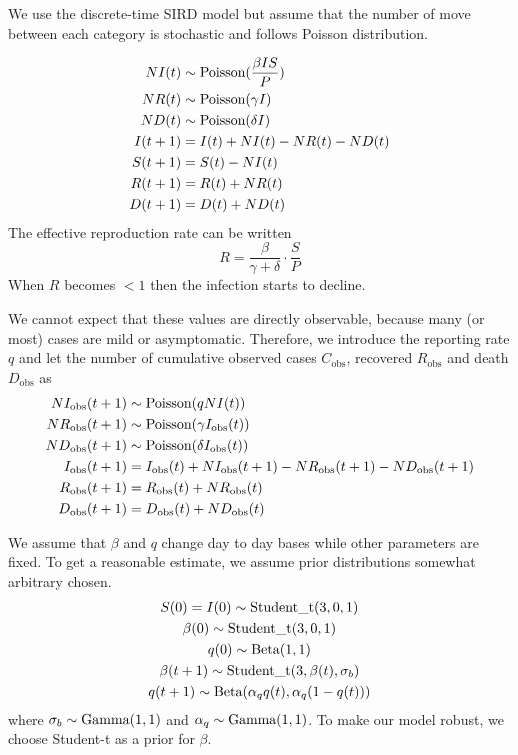 \documentclass{amsart}
\begin{document}
We use the discrete-time SIRD model but assume that the number of move between each category is stochastic and follows Poisson distribution.

\begin{align}
 NI(t) &\sim \textup{Poisson}(\frac{\beta I S}{P})\\
 NR(t) &\sim \textup{Poisson}(\gamma I)\\
 ND(t) &\sim \textup{Poisson}(\delta I)\\
 I(t+1) &= I(t) + NI(t) - NR(t) - ND(t)\\
 S(t+1) &= S(t) - NI(t)\\
 R(t+1) &= R(t) + NR(t)\\
 D(t+1) &= D(t) + ND(t)
\end{align}
The effective reproduction rate can be written
\begin{equation}
    R = \frac{\beta}{\gamma + \delta} \cdot \frac{S}{P}
\end{equation}
When $R$ becomes $<1$ then the infection starts to decline.

We cannot expect that these values are directly observable, because many (or most) cases are mild or asymptomatic.
Therefore, we introduce the reporting rate $q$ and let the number of cumulative observed cases $C_{\text{obs}}$, recovered $R_{\text{obs}}$ and death $D_{\text{obs}}$ as
\begin{align}
 NI_{\text{obs}}(t+1) &\sim \textup{Poisson}(q NI(t))\\
 NR_{\text{obs}}(t+1) &\sim \textup{Poisson}(\gamma I_{\text{obs}}(t))\\
 ND_{\text{obs}}(t+1) &\sim \textup{Poisson}(\delta I_{\text{obs}}(t))\\
 I_{\text{obs}}(t+1) &= I_{\text{obs}}(t) + NI_{\text{obs}}(t+1) - NR_{\text{obs}}(t+1) - ND_{\text{obs}}(t+1)\\
 R_{\text{obs}}(t+1) &= R_{\text{obs}}(t) + NR_{\text{obs}}(t)\\
 D_{\text{obs}}(t+1) &= D_{\text{obs}}(t) + ND_{\text{obs}}(t)
\end{align}

We assume that $\beta$ and $q$ change day to day bases while other parameters are fixed.
To get a reasonable estimate, we assume prior distributions somewhat arbitrary chosen.
\begin{gather}
 S(0) = I(0) \sim \textup{Student\_t}(3, 0, 1)\\
 \beta(0) \sim \textup{Student\_t}(3, 0, 1)\\
 q(0) \sim \textup{Beta}(1, 1)\\
 \beta(t+1) \sim \textup{Student\_t}(3, \beta(t), \sigma_b)\\
 q(t+1) \sim \textup{Beta}(\alpha_q q(t), \alpha_q(1 - q(t)))
\end{gather}
where $\sigma_b \sim \textup{Gamma}(1, 1)$ and $\alpha_q \sim \textup{Gamma}(1, 1)$.
To make our model robust, we choose Student-t as a prior for $\beta$.
\end{document}
